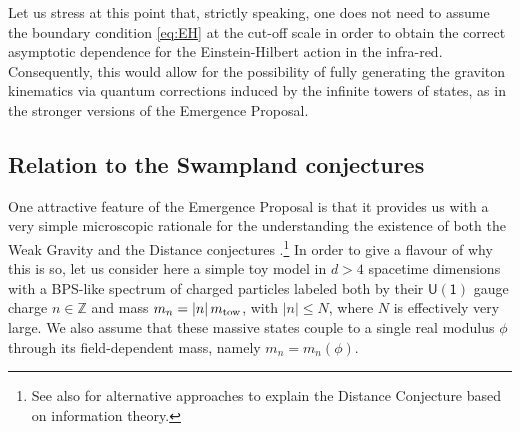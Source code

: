 Let us stress at this point that, strictly speaking, one does not need to assume the boundary condition \eqref{eq:EH} at the cut-off scale in order to obtain the correct asymptotic dependence for the Einstein-Hilbert action in the infra-red. Consequently, this would allow for the possibility of fully generating the graviton kinematics via quantum corrections induced by the infinite towers of states, as in the stronger versions of the Emergence Proposal. %

\subsection{Relation to the Swampland conjectures}
\label{ss:Emergence&Swampland}
	
One attractive feature of the Emergence Proposal is that it provides us with a very simple microscopic rationale for the understanding the existence of both the Weak Gravity and the Distance conjectures \cite{Arkani-Hamed:2006emk,Heidenreich:2015nta,Heidenreich:2016aqi,Montero:2016tif,Andriolo:2018lvp,Ooguri:2006in, Etheredge:2022opl}.\footnote{See also \cite{Stout:2021ubb,Stout:2022phm} for alternative approaches to explain the Distance Conjecture based on information theory.} In order to give a flavour of why this is so, let us consider here a simple toy model in $d > 4$ spacetime dimensions with a BPS-like spectrum of charged particles labeled both by their $\mathsf{U(1)}$ gauge charge $n \in \mathbb{Z}$ and mass $m_n=|n|\, m_{\text{tow}}$, with $|n| \leq N$, where $N$ is effectively very large. We also assume that these massive states couple to a single real modulus $\phi$ through its field-dependent mass, namely $m_n = m_n (\phi)$.

